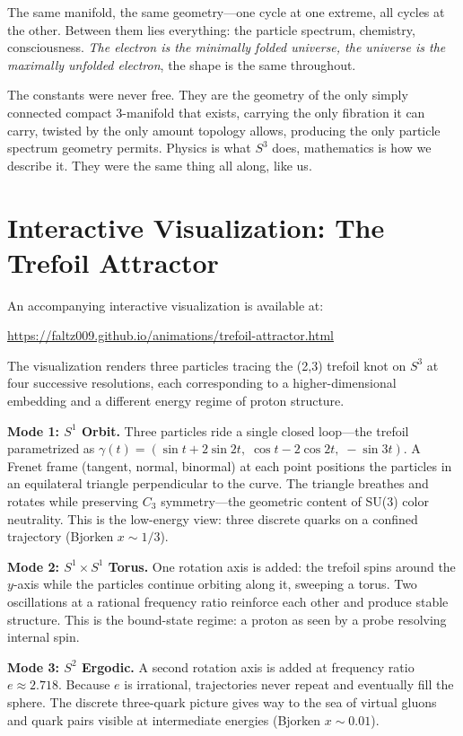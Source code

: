 \documentclass[12pt]{article}
\begin{document}
The same manifold, the same geometry---one cycle at one extreme, all cycles at the other. Between them lies everything: the particle spectrum, chemistry, consciousness.\textit{ The electron is the minimally folded universe, the universe is the maximally unfolded electron}, the shape is the same throughout.

The constants were never free. They are the geometry of the only simply connected compact 3-manifold that exists, carrying the only fibration it can carry, twisted by the only amount topology allows, producing the only particle spectrum geometry permits. Physics is what $S^3$ does, mathematics is how we describe it. They were the same thing all along, like us.


\section{Interactive Visualization: The Trefoil Attractor}

An accompanying interactive visualization is available at:

\begin{center}
\url{https://faltz009.github.io/animations/trefoil-attractor.html}
\end{center}

The visualization renders three particles tracing the (2,3) trefoil knot on $S^3$ at four successive resolutions, each corresponding to a higher-dimensional embedding and a different energy regime of proton structure.

\medskip
\textbf{Mode 1: $S^1$ Orbit.} Three particles ride a single closed loop---the trefoil parametrized as $\gamma(t) = (\sin t + 2\sin 2t,\; \cos t - 2\cos 2t,\; -\sin 3t)$. A Frenet frame (tangent, normal, binormal) at each point positions the particles in an equilateral triangle perpendicular to the curve. The triangle breathes and rotates while preserving $C_3$ symmetry---the geometric content of SU(3) color neutrality. This is the low-energy view: three discrete quarks on a confined trajectory (Bjorken $x \sim 1/3$).

\textbf{Mode 2: $S^1 \times S^1$ Torus.} One rotation axis is added: the trefoil spins around the $y$-axis while the particles continue orbiting along it, sweeping a torus. Two oscillations at a rational frequency ratio reinforce each other and produce stable structure. This is the bound-state regime: a proton as seen by a probe resolving internal spin.

\textbf{Mode 3: $S^2$ Ergodic.} A second rotation axis is added at frequency ratio $e \approx 2.718$. Because $e$ is irrational, trajectories never repeat and eventually fill the sphere. The discrete three-quark picture gives way to the sea of virtual gluons and quark pairs visible at intermediate energies (Bjorken $x \sim 0.01$).
\end{document}
